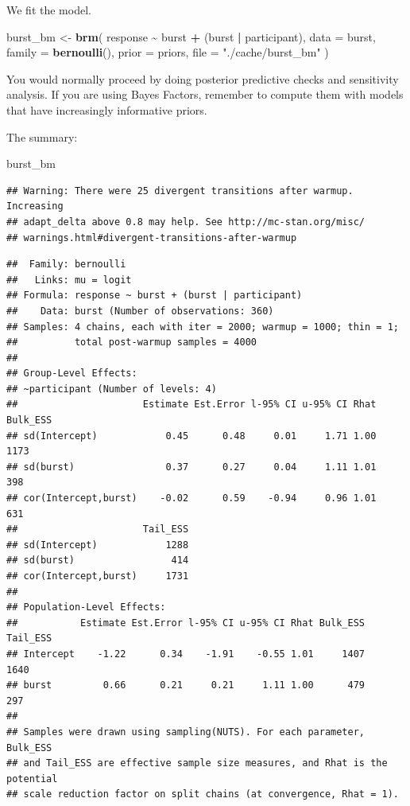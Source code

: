 \documentclass[
]{article}
\newenvironment{Shaded}{\begin{snugshade}}{\end{snugshade}}
\newcommand{\DataTypeTok}[1]{\textcolor[rgb]{0.13,0.29,0.53}{#1}}
\newcommand{\KeywordTok}[1]{\textcolor[rgb]{0.13,0.29,0.53}{\textbf{#1}}}
\newcommand{\NormalTok}[1]{#1}
\newcommand{\OperatorTok}[1]{\textcolor[rgb]{0.81,0.36,0.00}{\textbf{#1}}}
\newcommand{\StringTok}[1]{\textcolor[rgb]{0.31,0.60,0.02}{#1}}
\begin{document}
We fit the model.

\begin{Shaded}
\begin{Highlighting}[]
\NormalTok{burst\_bm \textless{}{-}}\StringTok{ }\KeywordTok{brm}\NormalTok{(}
\NormalTok{  response }\OperatorTok{\textasciitilde{}}
\StringTok{    }\NormalTok{burst }\OperatorTok{+}
\StringTok{    }\NormalTok{(burst }\OperatorTok{|}\StringTok{ }\NormalTok{participant),}
  \DataTypeTok{data =}\NormalTok{ burst,}
  \DataTypeTok{family =} \KeywordTok{bernoulli}\NormalTok{(),}
  \DataTypeTok{prior =}\NormalTok{ priors,}
  \DataTypeTok{file =} \StringTok{"./cache/burst\_bm"}
\NormalTok{)}
\end{Highlighting}
\end{Shaded}

You would normally proceed by doing posterior predictive checks and
sensitivity analysis. If you are using Bayes Factors, remember to
compute them with models that have increasingly informative priors.

The summary:

\begin{Shaded}
\begin{Highlighting}[]
\NormalTok{burst\_bm}
\end{Highlighting}
\end{Shaded}

\begin{verbatim}
## Warning: There were 25 divergent transitions after warmup. Increasing
## adapt_delta above 0.8 may help. See http://mc-stan.org/misc/
## warnings.html#divergent-transitions-after-warmup
\end{verbatim}

\begin{verbatim}
##  Family: bernoulli 
##   Links: mu = logit 
## Formula: response ~ burst + (burst | participant) 
##    Data: burst (Number of observations: 360) 
## Samples: 4 chains, each with iter = 2000; warmup = 1000; thin = 1;
##          total post-warmup samples = 4000
## 
## Group-Level Effects: 
## ~participant (Number of levels: 4) 
##                      Estimate Est.Error l-95% CI u-95% CI Rhat Bulk_ESS
## sd(Intercept)            0.45      0.48     0.01     1.71 1.00     1173
## sd(burst)                0.37      0.27     0.04     1.11 1.01      398
## cor(Intercept,burst)    -0.02      0.59    -0.94     0.96 1.01      631
##                      Tail_ESS
## sd(Intercept)            1288
## sd(burst)                 414
## cor(Intercept,burst)     1731
## 
## Population-Level Effects: 
##           Estimate Est.Error l-95% CI u-95% CI Rhat Bulk_ESS Tail_ESS
## Intercept    -1.22      0.34    -1.91    -0.55 1.01     1407     1640
## burst         0.66      0.21     0.21     1.11 1.00      479      297
## 
## Samples were drawn using sampling(NUTS). For each parameter, Bulk_ESS
## and Tail_ESS are effective sample size measures, and Rhat is the potential
## scale reduction factor on split chains (at convergence, Rhat = 1).
\end{verbatim}
\end{document}
